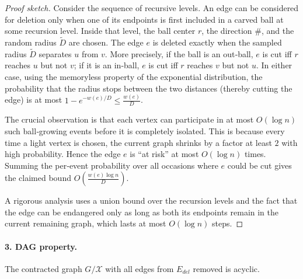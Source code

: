 \begin{proof}[Proof sketch]
    Consider the sequence of recursive levels. An edge can be considered for deletion only when one of its endpoints is first included in a carved ball at some recursion level. Inside that level, the ball center $r$, the direction $\#$, and the random radius $\tilde D$ are chosen. The edge $e$ is deleted exactly when the sampled radius $\tilde D$ separates $u$ from $v$. More precisely, if the ball is an out‑ball, $e$ is cut iff $r$ reaches $u$ but not $v$; if it is an in‑ball, $e$ is cut iff $r$ reaches $v$ but not $u$. In either case, using the memoryless property of the exponential distribution, the probability that the radius stops between the two distances (thereby cutting the edge) is at most $1 - e^{-w(e)/D} \le \frac{w(e)}{D}$.
    
    The crucial observation is that each vertex can participate in at most $O(\log n)$ such ball‑growing events before it is completely isolated. This is because every time a light vertex is chosen, the current graph shrinks by a factor at least $2$ with high probability. Hence the edge $e$ is ``at risk'' at most $O(\log n)$ times. Summing the per‑event probability over all occasions where $e$ could be cut gives the claimed bound $O\!\left(\frac{w(e) \log n}{D}\right)$.
    
    A rigorous analysis uses a union bound over the recursion levels and the fact that the edge can be endangered only as long as both its endpoints remain in the current remaining graph, which lasts at most $O(\log n)$ steps.
\end{proof}

\paragraph{3. DAG property.}
The contracted graph $G / \mathcal{X}$ with all edges from $E_{del}$ removed is acyclic.

